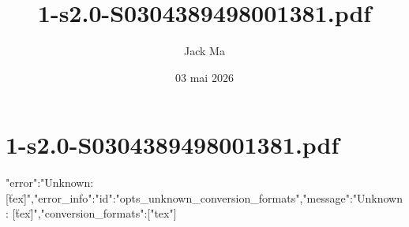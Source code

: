 \documentclass[12pt,a4paper]{article}
\title{1-s2.0-S0304389498001381.pdf}
\author{Jack Ma}
\date{03 mai 2026}
\begin{document}
\maketitle

\section*{1-s2.0-S0304389498001381.pdf}
{"error":"Unknown: [\"tex\"]","error_info":{"id":"opts_unknown_conversion_formats","message":"Unknown: [\"tex\"]","conversion_formats":["tex"]}}
\end{document}
